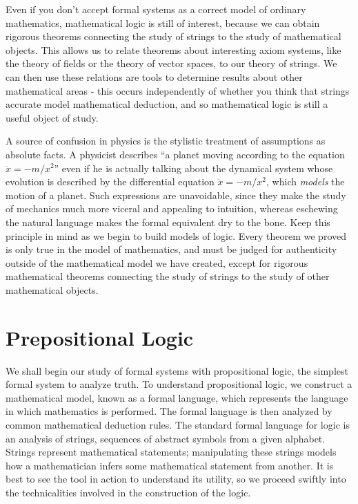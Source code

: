 Even if you don't accept formal systems as a correct model of ordinary mathematics, mathematical logic is still of interest, because we can obtain rigorous theorems connecting the study of strings to the study of mathematical objects. This allows us to relate theorems about interesting axiom systems, like the theory of fields or the theory of vector spaces, to our theory of strings. We can then use these relations are tools to determine results about other mathematical areas - this occurs independently of whether you think that strings accurate model mathematical deduction, and so mathematical logic is still a useful object of study.

A source of confusion in physics is the stylistic treatment of assumptions as absolute facts. A physicist describes ``a planet moving according to the equation $\ddot{x} = -m/x^2$'' even if he is actually talking about the dynamical system whose evolution is described by the differential equation $\ddot{x} = -m/x^2$, which {\it models} the motion of a planet. Such expressions are unavoidable, since they make the study of mechanics much more viceral and appealing to intuition, whereas eschewing the natural language makes the formal equivalent dry to the bone. Keep this principle in mind as we begin to build models of logic. Every theorem we proved is only true in the model of mathematics, and must be judged for authenticity outside of the mathematical model we have created, except for rigorous mathematical theorems connecting the study of strings to the study of other mathematical objects.






\chapter{Prepositional Logic}

We shall begin our study of formal systems with propositional logic, the simplest formal system to analyze truth. To understand propositional logic, we construct a mathematical model, known as a formal language, which represents the language in which mathematics is performed. The formal language is then analyzed by common mathematical deduction rules. The standard formal language for logic is an analysis of strings, sequences of abstract symbols from a given alphabet. Strings represent mathematical statements; manipulating these strings models how a mathematician infers some mathematical statement from another. It is best to see the tool in action to understand its utility, so we proceed swiftly into the technicalities involved in the construction of the logic.

